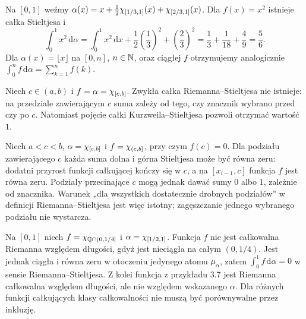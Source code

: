 \begin{przyklad}
Na $[0,1]$ weźmy $\alpha(x)=x+\tfrac12\chi_{[1/3,1]}(x)+\chi_{[2/3,1]}(x)$. Dla $f(x)=x^2$ istnieje całka Stieltjesa i
\[
\int_0^1x^2\,\mathrm d\alpha=\int_0^1x^2\,\mathrm dx+\frac12\left(\frac13\right)^2+\left(\frac23\right)^2=\frac13+\frac1{18}+\frac49=\frac56.
\]
Dla $\alpha(x)=\lfloor x\rfloor$ na $[0,n]$, $n\in\mathbb N$, oraz ciągłej $f$ otrzymujemy analogicznie $\int_0^n f\,\mathrm d\alpha=\sum_{k=1}^n f(k)$.
\end{przyklad}
\begin{przyklad}
Niech $c\in(a,b)$ i $f=\alpha=\chi_{[c,b]}$. Zwykła całka Riemanna--Stieltjesa nie istnieje: na przedziale zawierającym $c$ suma zależy od tego, czy znacznik wybrano przed czy po $c$. Natomiast pojęcie całki Kurzweila--Stieltjesa pozwoli otrzymać wartość $1$.
\end{przyklad}
\begin{przyklad}
Niech $a<c<b$, $\alpha=\chi_{[c,b]}$ i $f=\chi_{(c,b]}$, przy czym $f(c)=0$. Dla podziału zawierającego $c$ każda suma dolna i górna Stieltjesa może być równa zeru: dodatni przyrost funkcji całkującej kończy się w $c$, a na $[x_{i-1},c]$ funkcja $f$ jest równa zeru. Podziały przecinające $c$ mogą jednak dawać sumy $0$ albo $1$, zależnie od znacznika. Warunek „dla wszystkich dostatecznie drobnych podziałów” w definicji Riemanna--Stieltjesa jest więc istotny; zagęszczanie jednego wybranego podziału nie wystarcza.
\end{przyklad}
\begin{przyklad}
Na $[0,1]$ niech $f=\chi_{\mathbb Q\cap(0,1/4]}$ i $\alpha=\chi_{[1/2,1]}$. Funkcja $f$ nie jest całkowalna Riemanna względem długości, gdyż jest nieciągła na całym $(0,1/4)$. Jest jednak ciągła i równa zeru w otoczeniu jedynego atomu $\mu_\alpha$, zatem $\int_0^1 f\,\mathrm d\alpha=0$ w sensie Riemanna--Stieltjesa. Z kolei funkcja z przykładu 3.7 jest Riemanna całkowalna względem długości, ale nie względem wskazanego $\alpha$. Dla różnych funkcji całkujących klasy całkowalności nie muszą być porównywalne przez inkluzję.
\end{przyklad}

